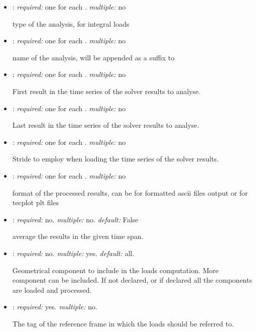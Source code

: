 \begin{itemize}
\item {}: \textit{required:} one for each . \textit{multiple:} no

type of the analysis,  for integral loads

\item {}: \textit{required:} one for each . \textit{multiple:} no

name of the analysis, will be appended as a suffix to 

\item {}: \textit{required:} one for each . \textit{multiple:} no

First result in the time series of the solver results to analyse.

\item {}: \textit{required:} one for each . \textit{multiple:} no

Last result in the time series of the solver results to analyse.

\item {}: \textit{required:} one for each . \textit{multiple:} no

Stride to employ when loading the time series of the solver results. 

\item {}: \textit{required:} one for each . \textit{multiple:} no

format of the processed results, can be  for formatted ascii files output or 
 for tecplot plt files

\item {}: \textit{required:} no. \textit{multiple:} no. \textit{default:} False

average the results in the given time span.

\item {}: \textit{required:} no. \textit{multiple:} yes. \textit{default:} all.

Geometrical component to include in the loads computation. More component can be included. 
If not declared, or if declared  all the components are loaded and processed. 

\item {}: \textit{required:} yes. \textit{multiple:} no.

The tag of the reference frame in which the loads should be referred to. 

\end{itemize}


